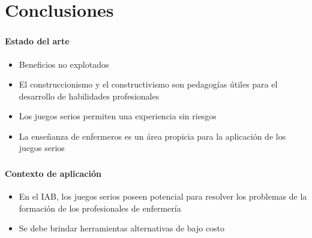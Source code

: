 \section{Conclusiones}
\setcounter{sectiontotal}{7}

\begin{frame}
\frametitle{\pagetitle}
\framesubtitle{Estado del arte}
\begin{itemize}[<+->]

\item Beneficios no explotados

\item El construccionismo y el constructivismo son pedagogías útiles para el
desarrollo de habilidades profesionales

\item Los juegos serios permiten una experiencia sin riesgos


\item La enseñanza de enfermeros es un área propicia para la
aplicación de los juegos serios

\end{itemize}
\end{frame}

\begin{frame}
\frametitle{\pagetitle}
\framesubtitle{Contexto de aplicación}
\begin{itemize}[<+->]
\item En el IAB, los juegos serios poseen potencial para resolver los problemas de la formación de los profesionales de enfermería

\item Se debe brindar herramientas alternativas de bajo costo
\end{itemize}
\end{frame}

